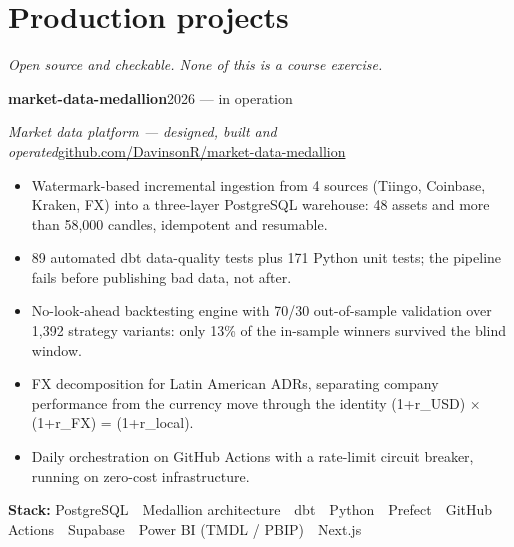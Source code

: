 \documentclass[a4paper,10pt]{article}
\newcommand{\headline}[2]{\needspace{3\baselineskip}\textbf{\color{ink}#1}\hfill{\small #2}\par}
\newcommand{\subline}[2]{\textit{#1}\hfill{\small #2}\par}
\begin{document}
\section*{Production projects}
{\small\itshape Open source and checkable. None of this is a course exercise.}\par\vspace{3pt}
\headline{market-data-medallion}{2026 --- in operation}
\subline{Market data platform --- designed, built and operated}{\href{https://github.com/DavinsonR/market-data-medallion}{github.com/DavinsonR/market-data-medallion}}
\begin{itemize}[leftmargin=1.1em, itemsep=0pt, topsep=1pt, parsep=0pt]
  \item Watermark-based incremental ingestion from 4 sources (Tiingo, Coinbase, Kraken, FX) into a three-layer PostgreSQL warehouse: 48 assets and more than 58,000 candles, idempotent and resumable.
  \item 89 automated dbt data-quality tests plus 171 Python unit tests; the pipeline fails before publishing bad data, not after.
  \item No-look-ahead backtesting engine with 70/30 out-of-sample validation over 1,392 strategy variants: only 13\% of the in-sample winners survived the blind window.
  \item FX decomposition for Latin American ADRs, separating company performance from the currency move through the identity (1+r\_USD) $\times$ (1+r\_FX) = (1+r\_local).
  \item Daily orchestration on GitHub Actions with a rate-limit circuit breaker, running on zero-cost infrastructure.
\end{itemize}
{\small\textbf{Stack:} PostgreSQL \,\textperiodcentered\, Medallion architecture \,\textperiodcentered\, dbt \,\textperiodcentered\, Python \,\textperiodcentered\, Prefect \,\textperiodcentered\, GitHub Actions \,\textperiodcentered\, Supabase \,\textperiodcentered\, Power BI (TMDL / PBIP) \,\textperiodcentered\, Next.js}\par
\vspace{4pt}
\end{document}
